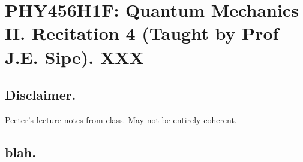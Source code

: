
%

\chapter{PHY456H1F: Quantum Mechanics II.  Recitation 4 (Taught by Prof J.E. Sipe).  XXX}
\label{chap:qmTwoR4}
{}
\date{Nov 11, 2011}

\beginArtWithToc

\section{Disclaimer.}

Peeter's lecture notes from class.  May not be entirely coherent.

\section{blah.}

\cite{desai2009quantum}

\EndArticle
